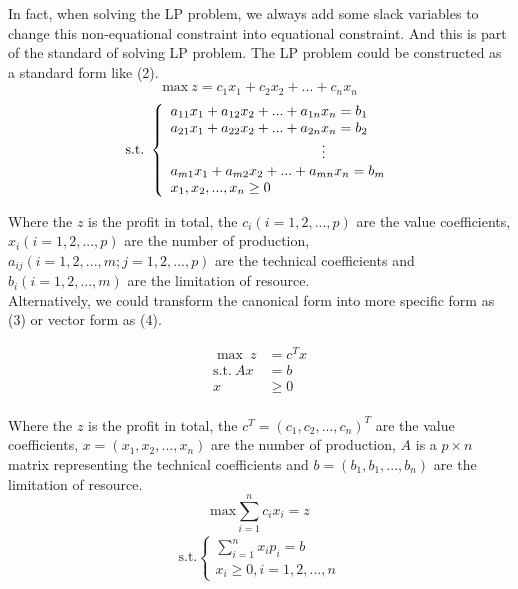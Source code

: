 \documentclass[12pt,a4paper]{article}
\begin{document}
	In fact, when solving the LP problem, we always add some slack variables to change this non-equational constraint into equational constraint. And this is part of the standard of solving LP problem. The LP problem could be constructed as a standard form like (2). 
	$$\text{max} \ z = c_1x_1+c_2x_2+...+c_nx_n$$	
	\begin{equation}
	\begin{aligned}
	\text{s.t.}\ 
	\left\{
		\begin{array}{lr}
		a_{11}x_1+a_{12}x_2+...+a_{1n}x_{n} = b_1 \\
		a_{21}x_1+a_{22}x_2+...+a_{2n}x_{n} = b_2\\
		\hspace{38mm} \vdots \\
		a_{m1}x_1+a_{m2}x_2+...+a_{mn}x_{n} = b_m\\
		x_1,x_2,...,x_n  \geq  0
		\end{array}
	\right.\\
	\end{aligned}
	\end{equation}
	
Where the $z$ is the profit in total, the $c_i(i=1,2,...,p)$ are the value coefficients, $x_i(i=1,2,...,p)$ are the number of production, $a_{ij}(i=1,2,...,m; j=1,2,...,p)$ are the technical coefficients and $b_i(i=1,2,...,m)$ are the limitation of resource.\\
Alternatively, we could transform the canonical form into more specific form as (3) or vector form as (4).

	\begin{equation}
	\begin{aligned}
		\max \ z &= c^Tx \\
		\text{s.t.}\ Ax &= b \\ 
		x &\geq 0
	\end{aligned}
	\end{equation}\\
\indent Where the $z$ is the profit in total, the $c^T=(c_1,c_2,...,c_n)^T$ are the value coefficients, $x=(x_1,x_2,...,x_n)$ are the number of production, $A$ is a $p\times n$ matrix representing the technical coefficients and $b=(b_1, b_1,...,b_n)$ are the limitation of resource.\\

	$$\text{max} \sum_{i=1}^{n}{c_ix_i}=z$$
	\begin{equation}
	\begin{aligned}
	\text{s.t.}
	\left\{
	\begin{array}{lr}
		\sum_{i=1}^{n}{x_ip_i} = b\\
		{x_i \geq 0, i=1,2,...,n}
	\end{array}
	\right.
	\end{aligned}
	\end{equation}
\end{document}
